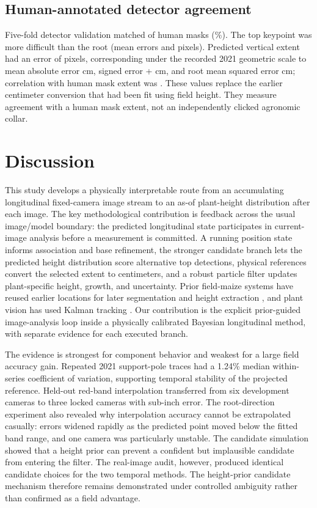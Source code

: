 \documentclass[12pt,letterpaper]{article}
\let\cite\parencite
\begin{document}
\subsection{Human-annotated detector agreement}

Five-fold detector validation matched \PixelMatched{} of \PixelInstances{} human masks (\PixelDetectionRate{}\%). The top keypoint was more difficult than the root (mean errors \PixelTopMAEPx{} and \PixelRootMAEPx{} pixels). Predicted vertical extent had an error of \PixelHeightMAEPx{} pixels, corresponding under the recorded 2021 geometric scale to mean absolute error \PixelHeightMAECm{} cm, signed error +\PixelHeightBiasCm{} cm, and root mean squared error \PixelHeightRMSECm{} cm; correlation with human mask extent was \PixelHeightCorr{}. These values replace the earlier centimeter conversion that had been fit using field height. They measure agreement with a human mask extent, not an independently clicked agronomic collar.

\section{Discussion}

This study develops a physically interpretable route from an accumulating longitudinal fixed-camera image stream to an as-of plant-height distribution after each image. The key methodological contribution is feedback across the usual image/model boundary: the predicted longitudinal state participates in current-image analysis before a measurement is committed. A running position state informs association and base refinement, the stronger candidate branch lets the predicted height distribution score alternative top detections, physical references convert the selected extent to centimeters, and a robust particle filter updates plant-specific height, growth, and uncertainty. Prior field-maize systems have reused earlier locations for later segmentation and height extraction \cite{gao2022individual,li2023multisource}, and plant vision has used Kalman tracking \cite{li2022kalman}. Our contribution is the explicit prior-guided image-analysis loop inside a physically calibrated Bayesian longitudinal method, with separate evidence for each executed branch.

The evidence is strongest for component behavior and weakest for a large field accuracy gain. Repeated 2021 support-pole traces had a 1.24\% median within-series coefficient of variation, supporting temporal stability of the projected reference. Held-out red-band interpolation transferred from six development cameras to three locked cameras with sub-inch error. The root-direction experiment also revealed why interpolation accuracy cannot be extrapolated casually: errors widened rapidly as the predicted point moved below the fitted band range, and one camera was particularly unstable. The candidate simulation showed that a height prior can prevent a confident but implausible candidate from entering the filter. The real-image audit, however, produced identical candidate choices for the two temporal methods. The height-prior candidate mechanism therefore remains demonstrated under controlled ambiguity rather than confirmed as a field advantage.
\end{document}
